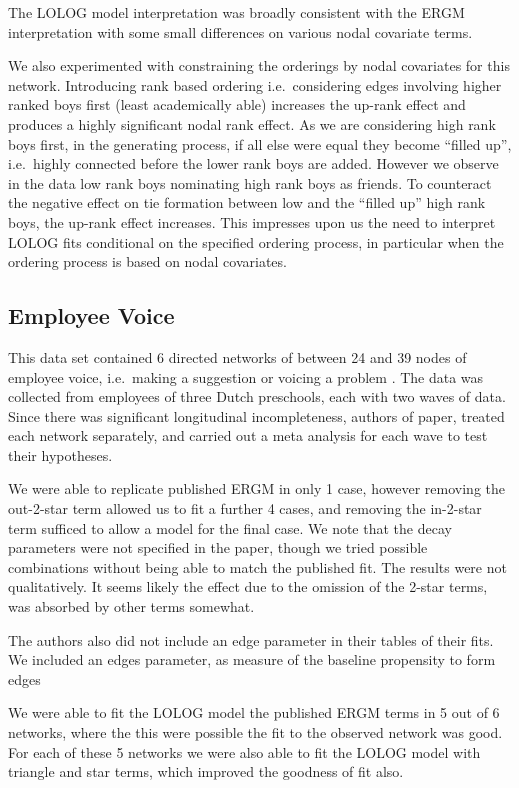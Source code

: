 \documentclass[
]{statsoc}
\begin{document}
The LOLOG model interpretation was broadly consistent with the ERGM
interpretation with some small differences on various nodal covariate
terms.

We also experimented with constraining the orderings by nodal covariates
for this network. Introducing rank based ordering i.e.~considering edges
involving higher ranked boys first (least academically able) increases
the up-rank effect and produces a highly significant nodal rank effect.
As we are considering high rank boys first, in the generating process,
if all else were equal they become ``filled up'', i.e.~highly connected
before the lower rank boys are added. However we observe in the data low
rank boys nominating high rank boys as friends. To counteract the
negative effect on tie formation between low and the ``filled up'' high
rank boys, the up-rank effect increases. This impresses upon us the need
to interpret LOLOG fits conditional on the specified ordering process,
in particular when the ordering process is based on nodal covariates.

\subsection{Employee Voice}

This data set contained 6 directed networks of between 24 and 39 nodes
of employee voice, i.e.~making a suggestion or voicing a problem
\cite{Pauksktat2011}. The data was collected from employees of three
Dutch preschools, each with two waves of data. Since there was
significant longitudinal incompleteness, authors of paper, treated each
network separately, and carried out a meta analysis for each wave to
test their hypotheses.

We were able to replicate published ERGM in only 1 case, however
removing the out-2-star term allowed us to fit a further 4 cases, and
removing the in-2-star term sufficed to allow a model for the final
case. We note that the decay parameters were not specified in the paper,
though we tried possible combinations without being able to match the
published fit. The results were not qualitatively. It seems likely the
effect due to the omission of the 2-star terms, was absorbed by other
terms somewhat.

The authors also did not include an edge parameter in their tables of
their fits. We included an edges parameter, as measure of the baseline
propensity to form edges

We were able to fit the LOLOG model the published ERGM terms in 5 out of
6 networks, where the this were possible the fit to the observed network
was good. For each of these 5 networks we were also able to fit the
LOLOG model with triangle and star terms, which improved the goodness of
fit also.
\end{document}
